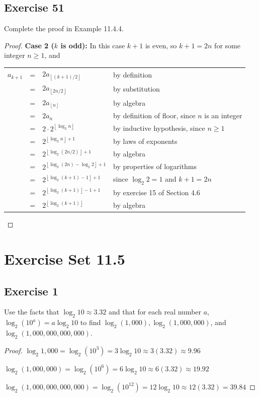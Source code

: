 \documentclass[14pt]{extarticle}
\newcommand{\cy}{\color{cyan}}
\newcommand{\floor}[1]{{\left\lfloor#1\right\rfloor}}
\begin{document}
\subsection{Exercise 51}
Complete the proof in Example 11.4.4.
\begin{proof}
{\bf Case 2 (\(k\) is odd):} In this case \(k+1\) is even, so \(k+1 = 2n\) for some integer \(n \geq 1\), and
\begin{center}
\begin{tabular}{rcll}
\(a_{k+1}\) & = & \(2a_{\floor{(k+1)/2}}\) & {\cy by definition} \\
& = & \(2a_{\floor{2n/2}}\) & {\cy by substitution} \\
& = & \(2a_{\floor{n}}\) & {\cy by algebra} \\
& = & \(2a_n\) & {\cy by definition of floor, since \(n\) is an integer} \\
& = & \(2 \cdot 2^{\floor{\log_2 n}}\) & {\cy by inductive hypothesis, since \(n \geq 1\)} \\
& = & \(2^{\floor{\log_2 n} + 1}\) & {\cy by laws of exponents} \\
& = & \(2^{\floor{\log_2 (2n/2)} + 1}\) & {\cy by algebra} \\
& = & \(2^{\floor{\log_2 (2n) - \log_2 2} + 1}\) & {\cy by properties of logarithms} \\
& = & \(2^{\floor{\log_2 (k+1) - 1} + 1}\) & {\cy since \(\log_2 2 = 1\) and \(k+1 = 2n\)} \\
& = & \(2^{\floor{\log_2 (k+1)} - 1 + 1}\) & {\cy by exercise 15 of Section 4.6} \\
& = & \(2^{\floor{\log_2 (k+1)}}\) & {\cy by algebra}
\end{tabular}
\end{center}
\end{proof}

\section{Exercise Set 11.5}
\subsection{Exercise 1}
Use the facts that \(\log_2 10 \approx 3.32\) and that for each real number \(a\), \(\log_2(10^a) = a \log_2 10\) to find 
\(\log_2(1,000), \log_2(1,000,000)\), and \(\log_2(1,000,000,000,000)\).

\begin{proof}
\(\log_2 1,000 = \log_2(10^3) = 3 \log_2 10 \approx 3(3.32) \approx 9.96\)

\(\log_2(1,000,000) = \log_2(10^6) = 6 \log_2 10 \approx 6(3.32) \approx 19.92\)

\(\log_2(1,000,000,000,000) = \log_2(10^{12}) = 12 \log_2 10 \approx 12(3.32) = 39.84\)
\end{proof}
\end{document}
